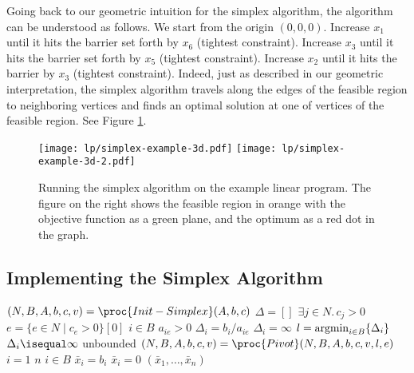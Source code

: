 Going back to our geometric intuition for the simplex algorithm, the algorithm can be understood as follows. We start from the origin $(0,0,0)$. Increase $x_1$ until it hits the barrier set forth by $x_6$ (tightest constraint). Increase $x_3$ until it hits the barrier set forth by $x_5$ (tightest constraint). Increase $x_2$ until it hits the barrier by $x_3$ (tightest constraint). Indeed, just as described in our geometric interpretation, the simplex algorithm travels along the edges of the feasible region to neighboring vertices and finds an optimal solution at one of vertices of the feasible region. See Figure \ref{fig:simplex-example}.

\begin{figure}[htbp]
    \centering
    \texttt{[image: lp/simplex-example-3d.pdf]}
    \qquad\qquad
    \texttt{[image: lp/simplex-example-3d-2.pdf]}
    \caption{Running the simplex algorithm on the example linear program. The figure on the right shows the feasible region in orange with the objective function as a green plane, and the optimum as a red dot in the graph.}
    \label{fig:simplex-example}
\end{figure}

\subsection{Implementing the Simplex Algorithm}

\begin{codebox}
    \li $(N,B,A,b,c,v) = \proc{Init-Simplex}(A,b,c)$ 
    \li $\Delta = []$ 
    \li \While $\exists j \in N.\, c_j > 0$ \Do
        \li {}
        \li $e = \{e \in N \mid c_e > 0 \}[0]$
        \li \For $i \in B$ \Do
            \li \If $a_{ie} > 0$ \Then
                \li $\Delta_i = b_i/a_{ie}$
            \li \Else $\Delta_i = \infty$
            \End
        \End
        \li {}
        \li $l = \operatorname*{\mathrm{argmin}}_{i \in B} \{ \Delta_i \}$
        \li \If $\Delta_i \isequal \infty$ \Then
            \li \Return unbounded
        \li \Else $(N,B,A,b,c,v) = \proc{Pivot}(N,B,A,b,c,v,l,e)$ 
        \End
    \End
    \li \For $i = 1$ \To $n$ \Do
        \li \If $i \in B$ \Then
            \li $\bar{x}_i = b_i$
        \li \Else $\bar{x}_i = 0$
        \End
    \End
    \li \Return $(\bar{x}_1,\ldots,\bar{x}_n)$
\end{codebox}

